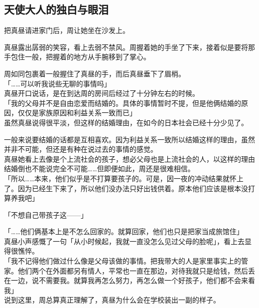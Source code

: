 \subsection{天使大人的独白与眼泪}

把真昼请进家门后，周让她坐在沙发上。

真昼露出孱弱的笑容，看上去弱不禁风。周握着她的手坐了下来，接着似是要将那手包住一般，把握着的地方从手腕移到了掌心。

周如同包裹着一般握住了真昼的手，而后真昼垂下了眉梢。\\

「……可以听我说些无聊的事情吗」\\

真昼开口说话，是在到达周的房间后经过了十分钟左右的时候。\\

「我的父母并不是自由恋爱而结婚的。具体的事情暂时不提，但是他俩结婚的原因，仅仅是家族原因和利益关系一致而已」\\

虽然真昼说得很平淡，但这样的结婚理由，在如今的日本社会已经十分少见了。

一般来说要结婚的话都是互相喜欢。因为利益关系一致所以结婚这样的理由，虽然并非不可能，但还是有种在说过去的事情的感觉。\\

真昼她看上去像是个上流社会的孩子，想必父母也是上流社会的人，以这样的理由结婚倒也不能说完全不可能……但即便如此，周还是很难相信。\\

「所以……本来，他们似乎是不打算要孩子的。可是，因一夜的冲动结果就怀上了。因为已经生下来了，所以他们没办法只好出钱供着。原本他们应该是根本没打算养我吧」

「不想自己带孩子这——」

「……他们俩基本上是不怎么回家的。就算回家，他们也只是把家当成旅馆住」\\

真昼小声感慨了一句「从小时候起，我就一直没怎么见过父母的脸呢」，看上去显得很憔悴。\\

「我不记得他们做过什么像是父母该做的事情。把我带大的人是家里事实上的管家。他们两个在外面都另有情人，平常也一直在那边，对待我就只是给钱，然后丢在一边，说不需要我。就算我再怎么努力，再怎么做一个好孩子，他们都不会来看我」\\

说到这里，周总算真正理解了，真昼为什么会在学校装出一副的样子。\\

